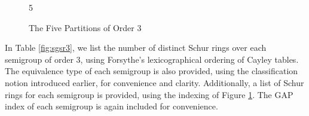 \documentclass{article}
\newcommand{\vertex}{
coordinate[draw, shape=circle, inner sep=2]
}
\theoremstyle{plain}
\theoremstyle{definition}
\begin{document}
\begin{figure}[ht]
\begin{multicols}{5}
\begin{center}
\end{center}
\end{multicols}
\caption{The Five Partitions of Order 3}
\label{fig:3-partition}
\end{figure}

In Table \ref{fig:sgsr3}, we list the number of distinct Schur rings over each semigroup of order $3$, using Forsythe's lexicographical ordering of Cayley tables. The equivalence type of each semigroup is also provided, using the classification notion introduced earlier, for convenience and clarity. Additionally, a list of Schur rings for each semigroup is provided, using the indexing of Figure \ref{fig:3-partition}. The GAP index of each semigroup is again included for convenience. 
\end{document}
